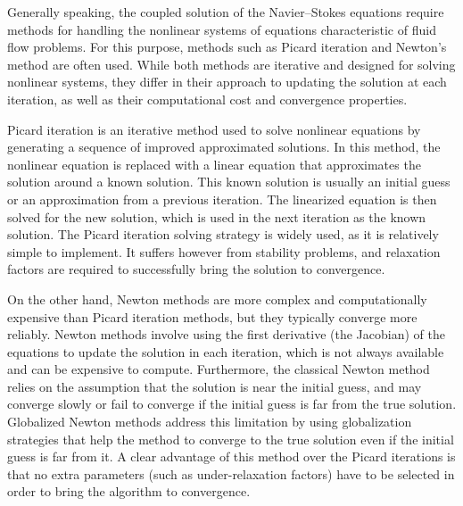 Generally speaking, the coupled solution of the Navier--Stokes equations require methods for handling the nonlinear systems of equations characteristic of fluid flow problems. For this purpose, methods such as Picard iteration and Newton's method are often used. While both methods are iterative and designed for solving nonlinear systems, they differ in their approach to updating the solution at each iteration, as well as their computational cost and convergence properties.

Picard iteration is an iterative method used to solve nonlinear equations by generating a sequence of improved approximated solutions. In this method, the nonlinear equation is replaced with a linear equation that approximates the solution around a known solution. This known solution is usually an initial guess or an approximation from a previous iteration. The linearized equation is then solved for the new solution, which is used in the next iteration as the known solution. The Picard iteration solving strategy is widely used, as it is relatively simple to implement. It suffers however from stability problems, and relaxation factors are required to successfully bring the solution to convergence. 

On the other hand, Newton methods are more complex and computationally expensive than Picard iteration methods, but they typically converge more reliably. Newton methods involve using the first derivative (the Jacobian) of the equations to update the solution in each iteration, which is not always available and can be expensive to compute. Furthermore, the classical Newton method relies on the assumption that the solution is near the initial guess, and may converge slowly or fail to converge if the initial guess is far from the true solution. Globalized Newton methods address this limitation by using globalization strategies that help the method to converge to the true solution even if the initial guess is far from it. A clear advantage of this method over the Picard iterations is that no extra parameters (such as under-relaxation factors) have to be selected in order to bring the algorithm to convergence. 
 
